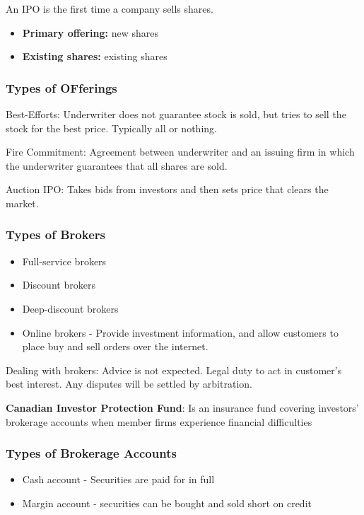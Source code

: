 \documentclass[english, 12pt]{article}
\begin{document}
\begin{defn}
An IPO is the first time a company sells shares.
\begin{itemize}
\item \textbf{Primary offering:} new shares
\item \textbf{Existing shares:} existing shares
\end{itemize}
\end{defn}



\subsubsection*{Types of OFferings}
\begin{defn}
Best-Efforts: Underwriter does not guarantee stock is sold, but tries to sell the stock for the best price. Typically all or nothing.
\end{defn}
\begin{defn}
Fire Commitment: Agreement between underwriter and an issuing firm in which the underwriter guarantees that all shares are sold.
\end{defn}
\begin{defn}
Auction IPO: Takes bids from investors and then sets price that clears the market.
\end{defn}

\subsubsection*{Types of Brokers}
\begin{itemize}
\item Full-service brokers
\item Discount brokers
\item Deep-discount brokers
\item Online brokers - Provide investment information, and allow customers to place buy and sell orders over the internet.
\end{itemize}
\begin{defn}
Dealing with brokers: Advice is not expected. Legal duty to act in customer's best interest. Any disputes will be settled by arbitration.
\end{defn}
\begin{defn}
\textbf{Canadian Investor Protection Fund}: Is an insurance fund covering investors' brokerage accounts when member firms experience financial difficulties
\end{defn}
\subsubsection*{Types of Brokerage Accounts}
\begin{itemize}
\item Cash account - Securities are paid for in full
\item Margin account - securities can be bought and sold short on credit
\end{itemize}
\end{document}
